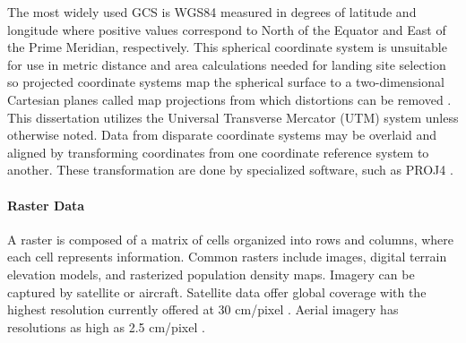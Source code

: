 The most widely used \acf{GCS} is WGS84 \cite{wgs84} measured in degrees of latitude  and longitude where positive values correspond to North of the Equator and East of the Prime Meridian, respectively. This spherical coordinate system is unsuitable for use in metric distance and area calculations needed for landing site selection so projected coordinate systems map the spherical surface to a two-dimensional Cartesian  planes called map projections from which distortions can be removed \cite{GIS_demystified}.
This dissertation utilizes the Universal Transverse Mercator (UTM) system unless otherwise noted. 
Data from disparate coordinate systems may be overlaid and aligned by transforming coordinates from one coordinate reference system to another. These transformation are done by specialized software, such as PROJ4 \cite{proj_contributors_proj_2018}.


\paragraph{Raster Data}

A raster is composed of a matrix of cells organized into rows and columns, where each cell represents information. Common rasters include images, digital terrain elevation models, and rasterized population density maps. 
Imagery can be captured by satellite or aircraft.  
Satellite data offer global coverage with the highest resolution currently offered at 30 cm/pixel \cite{2041-210X.12973}.  Aerial imagery has resolutions as high as 2.5 cm/pixel \cite{SHAO2021126954, 2041-210X.12973}. 

